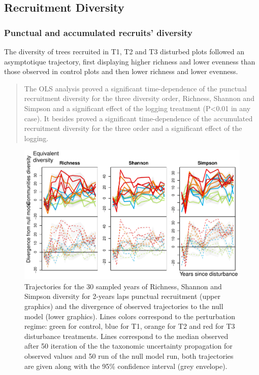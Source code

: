 \documentclass[fleqn,10pt]{ArtEcoFoG} %
\begin{document}
\subsection{Recruitment Diversity}\label{recruitment-diversity}

\subsubsection{Punctual and accumulated recruits'
diversity}\label{punctual-and-accumulated-recruits-diversity}

The diversity of trees recruited in T1, T2 and T3 disturbed plots
followed an asymptotique trajectory, first displaying higher richness
and lower evenness than those observed in control plots and then lower
richness and lower evenness.

\begin{quote}
The OLS analysis proved a significant time-dependence of the punctual
recruitment diversity for the three diversity order, Richness, Shannon
and Simpson and a significant effect of the logging treatment
(P\textless{}0.01 in any case). It besides proved a significant
time-dependence of the accumulated recruitment diversity for the three
order and a significant effect of the logging.
\end{quote}

\begin{figure}

{\centering \includegraphics[width=0.8\linewidth]{RecruitmentTrajectories_files/figure-latex/Fig1-1} 

}

\caption{Trajectories for the 30 sampled years of Richness, Shannon and Simpson diversity for 2-years laps punctual recruitment (upper graphics) and the divergence of observed trajectories to the null model (lower graphics). Lines colors correspond to the perturbation regime: green for control, blue for T1, orange for T2 and red for T3 disturbance treatments. Lines correspond to the median observed after 50 iteration of the the taxonomic uncertainty propagation for observed values and 50 run of the null model run, both trajectories are given along with the 95\% confidence interval (grey envelope).}\label{fig:Fig1}
\end{figure}
\end{document}
